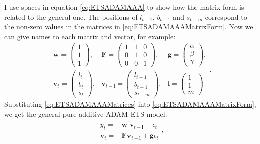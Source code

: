 \documentclass[
]{book}
\theoremstyle{definition}
\theoremstyle{definition}
\theoremstyle{definition}
\theoremstyle{definition}
\theoremstyle{remark}
\begin{document}
I use spaces in equation \eqref{eq:ETSADAMAAA} to show how the matrix form is related to the general one. The positions of \(l_{t-1}\), \(b_{t-1}\) and \(s_{t-m}\) correspond to the non-zero values in the matrices in \eqref{eq:ETSADAMAAAMatrixForm}. Now we can give names to each matrix and vector, for example:
\begin{equation}
  \begin{aligned}
    \mathbf{w} = \begin{pmatrix} 1 \\ 1 \\ 1 \end{pmatrix}, & \mathbf{F} = \begin{pmatrix} 1 & 1 & 0 \\ 0 & 1 & 0 \\ 0 & 0 & 1 \end{pmatrix}, & \mathbf{g} = \begin{pmatrix} \alpha \\ \beta \\ \gamma \end{pmatrix}, \\
    \mathbf{v}_{t} = \begin{pmatrix} l_t \\ b_t \\ s_t \end{pmatrix}, & \mathbf{v}_{t-\mathbf{l}} = \begin{pmatrix} l_{t-1} \\ b_{t-1} \\ s_{t-m} \end{pmatrix}, & \mathbf{l} = \begin{pmatrix} 1 \\ 1 \\ m \end{pmatrix}
  \end{aligned}.
  \label{eq:ETSADAMAAAMatrices}
\end{equation}
Substituting \eqref{eq:ETSADAMAAAMatrices} into \eqref{eq:ETSADAMAAAMatrixForm}, we get the general pure additive ADAM ETS model:
\begin{equation}
  \begin{aligned}
    {y}_{t} = &\mathbf{w}^\prime \mathbf{v}_{t-\mathbf{l}} + \epsilon_t \\
    \mathbf{v}_{t} = &\mathbf{F} \mathbf{v}_{t-\mathbf{l}} + \mathbf{g} \epsilon_t
  \end{aligned},
  \label{eq:ETSADAMStateSpacePureAdditive}
\end{equation}
\end{document}
